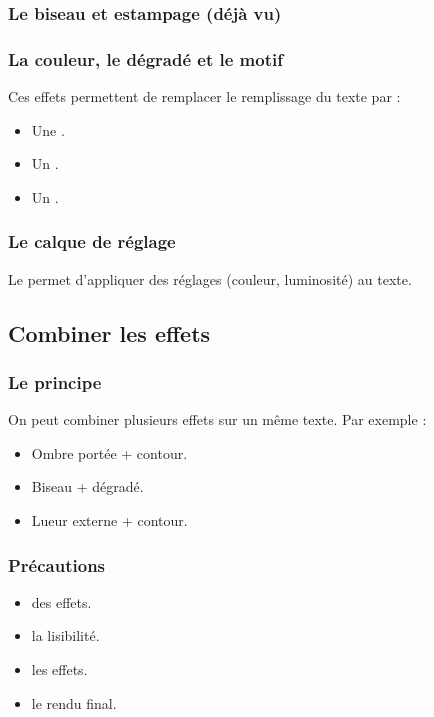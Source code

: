 \subsubsection{Le biseau et estampage (déjà vu)}

\subsubsection{La couleur, le dégradé et le motif}

Ces effets permettent de remplacer le remplissage du texte par :

\begin{itemize}
    \item Une .
    \item Un .
    \item Un .
\end{itemize}

\subsubsection{Le calque de réglage}

Le  permet d'appliquer des réglages (couleur, luminosité) au texte.

\subsection{Combiner les effets}

\subsubsection{Le principe}

On peut combiner plusieurs effets sur un même texte. Par exemple :

\begin{itemize}
    \item Ombre portée + contour.
    \item Biseau + dégradé.
    \item Lueur externe + contour.
\end{itemize}

\subsubsection{Précautions}

\begin{itemize}
    \item {} des effets.
    \item {} la lisibilité.
    \item {} les effets.
    \item {} le rendu final.
\end{itemize}

